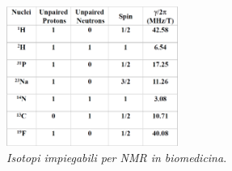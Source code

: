 \documentclass{report}
\numberwithin{equation}{section}
\numberwithin{figure}{section}
\begin{document}
\begin{figure}
    \centering
    \includegraphics[width=0.5\textwidth]{immagini/iso.png}
    \caption{\textit{Isotopi impiegabili per NMR in biomedicina}.}
    \label{fig:iso}
\end{figure}
\end{document}
